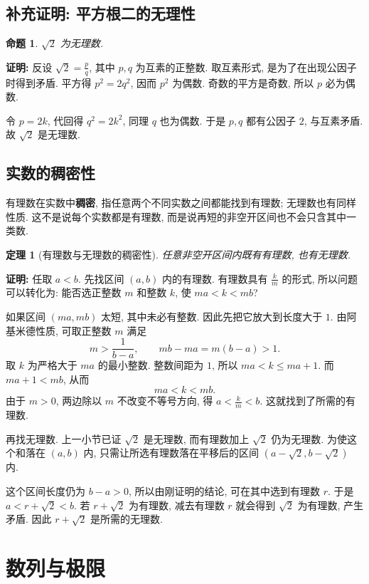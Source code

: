 \documentclass[UTF8,openany]{ctexbook}
\theoremstyle{chinesetextbook}
\newtheorem{theorem}{定理}[section]
\newenvironment{cnproof}{\par\indent\textbf{证明:} \ignorespaces}{\par}
\newtheorem*{propositionsingle}{命题}
\begin{document}
\subsection{补充证明: 平方根二的无理性}
\begin{propositionsingle}
$\sqrt2$ 为无理数.
\end{propositionsingle}
\begin{cnproof}
反设 $\displaystyle\sqrt2=\frac pq$, 其中 $p,q$ 为互素的正整数. 取互素形式, 是为了在出现公因子时得到矛盾. 平方得 $p^2=2q^2$, 因而 $p^2$ 为偶数. 奇数的平方是奇数, 所以 $p$ 必为偶数.

令 $p=2k$, 代回得 $q^2=2k^2$, 同理 $q$ 也为偶数. 于是 $p,q$ 都有公因子 $2$, 与互素矛盾. 故 $\sqrt2$ 是无理数.
\end{cnproof}
\subsection{实数的稠密性}
有理数在实数中\textbf{稠密}, 指任意两个不同实数之间都能找到有理数; 无理数也有同样性质. 这不是说每个实数都是有理数, 而是说再短的非空开区间也不会只含其中一类数.
\begin{theorem}[有理数与无理数的稠密性]
任意非空开区间内既有有理数, 也有无理数.
\end{theorem}
\begin{cnproof}
任取 $a<b$. 先找区间 $(a,b)$ 内的有理数. 有理数具有 $\displaystyle\frac{k}{m}$ 的形式, 所以问题可以转化为: 能否选正整数 $m$ 和整数 $k$, 使 $ma<k<mb$?

如果区间 $(ma,mb)$ 太短, 其中未必有整数. 因此先把它放大到长度大于 $1$. 由阿基米德性质, 可取正整数 $m$ 满足
\[
m>\frac1{b-a},\qquad mb-ma=m(b-a)>1.
\]
取 $k$ 为严格大于 $ma$ 的最小整数. 整数间距为 $1$, 所以 $ma<k\le ma+1$. 而 $ma+1<mb$, 从而
\[
ma<k<mb.
\]
由于 $m>0$, 两边除以 $m$ 不改变不等号方向, 得 $\displaystyle a<\frac{k}{m}<b$. 这就找到了所需的有理数. 

再找无理数. 上一小节已证 $\sqrt2$ 是无理数, 而有理数加上 $\sqrt2$ 仍为无理数. 为使这个和落在 $(a,b)$ 内, 只需让所选有理数落在平移后的区间 $(a-\sqrt2,b-\sqrt2)$ 内.

这个区间长度仍为 $b-a>0$, 所以由刚证明的结论, 可在其中选到有理数 $r$. 于是 $a<r+\sqrt2<b$. 若 $r+\sqrt2$ 为有理数, 减去有理数 $r$ 就会得到 $\sqrt2$ 为有理数, 产生矛盾. 因此 $r+\sqrt2$ 是所需的无理数.
\end{cnproof}
\section{数列与极限}
\end{document}
